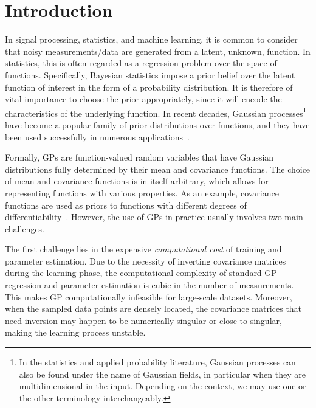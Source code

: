 \chapter{Introduction}
\label{chap:intro}
In signal processing, statistics, and machine learning, it is common to consider that noisy measurements/data are generated from a latent, unknown, function. In statistics, this is often regarded as a regression problem over the space of functions. Specifically, Bayesian statistics impose a prior belief over the latent function of interest in the form of a probability distribution. It is therefore of vital importance to choose the prior appropriately, since it will encode the characteristics of the underlying function. In recent decades, Gaussian processes\footnote{In the statistics and applied probability literature, Gaussian processes can also be found under the name of Gaussian fields, in particular when they are multidimensional in the input. Depending on the context, we may use one or the other terminology interchangeably.}~\citep[GPs,][]{Carl2006GPML} have become a popular family of prior distributions over functions, and they have been used successfully in numerous applications~\citep{Roberts2013, Hennig2015, Kocijan2016}.

Formally, GPs are function-valued random variables that have Gaussian distributions fully determined by their mean and covariance functions. The choice of mean and covariance functions is in itself arbitrary, which allows for representing functions with various properties. As an example, \matern covariance functions are used as priors to functions with different degrees of differentiability~\citep{Carl2006GPML}. However, the use of GPs in practice usually involves two main challenges.

The first challenge lies in the expensive \textit{computational cost} of training and parameter estimation. Due to the necessity of inverting covariance matrices during the learning phase, the computational complexity of standard GP regression and parameter estimation is cubic in the number of measurements. This makes GP computationally infeasible for large-scale datasets. Moreover, when the sampled data points are densely located, the covariance matrices that need inversion may happen to be numerically singular or close to singular, making the learning process unstable.


